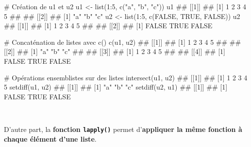 \documentclass[12pt,twosided, notitlepage]{book}
\newenvironment{Shaded}{}{}
\newcommand{\CommentTok}[1]{\textcolor[rgb]{0.00,0.50,0.00}{#1}}
\newcommand{\DecValTok}[1]{#1}
\newcommand{\KeywordTok}[1]{\textcolor[rgb]{0.00,0.00,1.00}{#1}}
\newcommand{\NormalTok}[1]{#1}
\newcommand{\OperatorTok}[1]{#1}
\newcommand{\OtherTok}[1]{\textcolor[rgb]{1.00,0.25,0.00}{#1}}
\newcommand{\StringTok}[1]{\textcolor[rgb]{0.00,0.50,0.50}{#1}}
\renewenvironment{Shaded}{\begin{snugshade}}{\end{snugshade}}
\begin{document}
\begin{Shaded}
\begin{Highlighting}[]
\CommentTok{# Création de u1 et u2}
\NormalTok{u1 <-}\StringTok{ }\KeywordTok{list}\NormalTok{(}\DecValTok{1}\OperatorTok{:}\DecValTok{5}\NormalTok{, }\KeywordTok{c}\NormalTok{(}\StringTok{"a"}\NormalTok{, }\StringTok{"b"}\NormalTok{, }\StringTok{"c"}\NormalTok{))}
\NormalTok{u1}
\NormalTok{  ## [[1]]}
\NormalTok{  ## [1] 1 2 3 4 5}
\NormalTok{  ## }
\NormalTok{  ## [[2]]}
\NormalTok{  ## [1] "a" "b" "c"}
\NormalTok{u2 <-}\StringTok{ }\KeywordTok{list}\NormalTok{(}\DecValTok{1}\OperatorTok{:}\DecValTok{5}\NormalTok{, }\KeywordTok{c}\NormalTok{(}\OtherTok{FALSE}\NormalTok{, }\OtherTok{TRUE}\NormalTok{, }\OtherTok{FALSE}\NormalTok{))}
\NormalTok{u2}
\NormalTok{  ## [[1]]}
\NormalTok{  ## [1] 1 2 3 4 5}
\NormalTok{  ## }
\NormalTok{  ## [[2]]}
\NormalTok{  ## [1] FALSE  TRUE FALSE}

\CommentTok{# Concaténation de listes avec c()}
\KeywordTok{c}\NormalTok{(u1, u2)}
\NormalTok{  ## [[1]]}
\NormalTok{  ## [1] 1 2 3 4 5}
\NormalTok{  ## }
\NormalTok{  ## [[2]]}
\NormalTok{  ## [1] "a" "b" "c"}
\NormalTok{  ## }
\NormalTok{  ## [[3]]}
\NormalTok{  ## [1] 1 2 3 4 5}
\NormalTok{  ## }
\NormalTok{  ## [[4]]}
\NormalTok{  ## [1] FALSE  TRUE FALSE}

\CommentTok{# Opérations ensemblistes sur des listes}
\KeywordTok{intersect}\NormalTok{(u1, u2)}
\NormalTok{  ## [[1]]}
\NormalTok{  ## [1] 1 2 3 4 5}
\KeywordTok{setdiff}\NormalTok{(u1, u2)}
\NormalTok{  ## [[1]]}
\NormalTok{  ## [1] "a" "b" "c"}
\KeywordTok{setdiff}\NormalTok{(u2, u1)}
\NormalTok{  ## [[1]]}
\NormalTok{  ## [1] FALSE  TRUE FALSE}
\end{Highlighting}
\end{Shaded}

~

D'autre part, la \textbf{fonction \texttt{lapply()}} permet
d'\textbf{appliquer la même fonction à chaque élément d'une
liste}.
\end{document}
